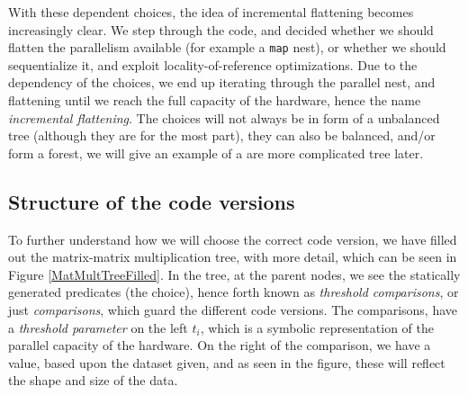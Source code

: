 With these dependent choices, the idea of incremental flattening becomes increasingly clear. We step through the code, and decided whether we should flatten the parallelism available (for example a \texttt{map} nest), or whether we should sequentialize it, and exploit locality-of-reference optimizations. Due to the dependency of the choices, we end up iterating through the parallel nest, and flattening until we reach the full capacity of the hardware, hence the name \textit{incremental flattening}. The choices will not always be in form of a unbalanced tree (although they are for the most part), they can also be balanced, and/or form a forest, we will give an example of a are more complicated tree later.

\subsection{Structure of the code versions}
To further understand how we will choose the correct code version, we have filled out the matrix-matrix multiplication tree, with more detail, which can be seen in Figure \ref{MatMultTreeFilled}. In the tree, at the parent nodes, we see the statically generated predicates (the choice), hence forth known as \textit{threshold comparisons}, or just \textit{comparisons}, which guard the different code versions. The comparisons, have a \textit{threshold parameter} on the left $t_i$, which is a symbolic representation of the parallel capacity of the hardware. On the right of the comparison, we have a value, based upon the dataset given, and as seen in the figure, these will reflect the shape and size of the data.
